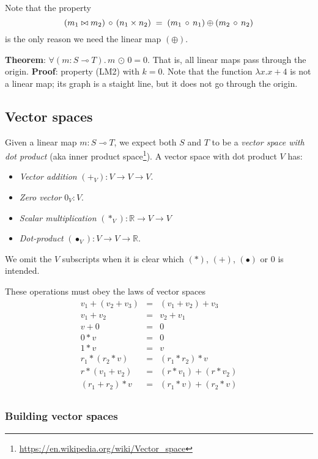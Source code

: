 \documentclass[sigplan,review]{acmart}
\renewcommand{\to}{\rightarrow}    %
\newcommand{\linto}{\multimap}     %
\newcommand{\tcolon}{\!:\!}
\newcommand{\real}{\mathbb{R}}       %
\newcommand{\dotprod}{\bullet}    %
\newcommand{\lmcomp}{\,\circ\,}   %
\newcommand{\lmvcat}{\times}         %
\newcommand{\lmhcat}{\bowtie}        %
\newcommand{\lmapply}{\,\odot\,}      %
\newcommand{\lmadd}{\oplus}        %
\begin{document}
Note that the property
$$
(m_1 \lmhcat m_2) \lmcomp (n_1 \lmvcat n_2) \; = \;  (m_1 \lmcomp n_1) \lmadd (m_2 \lmcomp n_2) \\
$$
is the only reason we need the linear map $(\lmadd)$.

{\bf Theorem}: $\forall (m \tcolon S \linto T).\, m \lmapply 0 = 0$.  That is, all linear maps
pass through the origin.  {\bf Proof}: property (LM2) with $k=0$.  Note that the function
$\lambda x. x+4$ is not a linear map; its graph is a staight line, but it does not
go through the origin.

\subsection{Vector spaces}

Given a linear map $m \tcolon S \linto T$, we expect both $S$ and $T$ to be
a \emph{vector space with dot product} (aka inner product space\footnote{\url{https://en.wikipedia.org/wiki/Vector_space}}).
A vector space with dot product $V$ has:
\begin{itemize}
\item \emph{Vector addition} $(+_V) : V \to V \to V$.
\item \emph{Zero vector} $0_V : V$.
\item \emph{Scalar multiplication} $(*_V) : \real \to V \to V$
\item \emph{Dot-product} $(\dotprod_V) : V \to V \to \real$.
\end{itemize}
We omit the $V$ subscripts when it is clear which $(*)$, $(+)$, $(\dotprod)$ or $0$ is intended.

These operations must obey the laws of vector spaces
$$
\begin{array}{rcl}
v_1 + (v_2 + v_3) & = & (v_1 + v_2) + v_3 \\
v_1 + v_2 & = & v_2 + v_1 \\
v + 0 & = & 0 \\
0 * v & = & 0 \\
1 * v & = & v \\
r_1 * ( r_2 * v) & = & (r_1 * r_2) * v \\
r * (v_1 + v_2) & = & (r * v_1) + (r * v_2) \\
(r_1 + r_2) * v & = & (r_1 * v) + (r_2 * v) \\
\end{array}
$$

\subsubsection{Building vector spaces}
\end{document}
